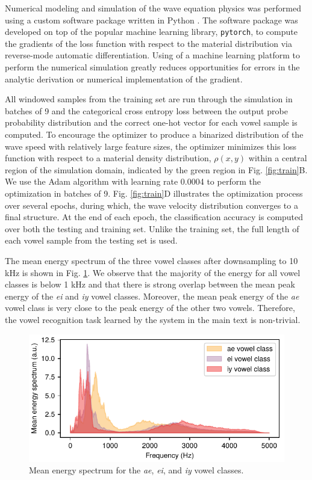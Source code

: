 Numerical modeling and simulation of the wave equation physics was performed using a custom software package written in Python \cite{wavetorch}.
The software package was developed on top of the popular machine learning library, \texttt{pytorch}, to compute the gradients of the loss function with respect to the material distribution via reverse-mode automatic differentiation.
Using of a machine learning platform to perform the numerical simulation greatly reduces opportunities for errors in the analytic derivation or numerical implementation of the gradient. 

All windowed samples from the training set are run through the simulation in batches of 9 and the categorical cross entropy loss between the output probe probability distribution and the correct one-hot vector for each vowel sample is computed.
To encourage the optimizer to produce a binarized distribution of the wave speed with relatively large feature sizes, the optimizer minimizes this loss function with respect to a material density distribution, $\rho{\left(x,y\right)}$ within a central region of the simulation domain, indicated by the green region in Fig. \ref{fig:train}B. 
We use the Adam algorithm \cite{kingma_adam_2014} with learning rate 0.0004 to perform the optimization in batches of 9.
Fig. \ref{fig:train}D illustrates the optimization process over several epochs, during which, the wave velocity distribution converges to a final structure.
At the end of each epoch, the classification accuracy is computed over both the testing and training set. 
Unlike the training set, the full length of each vowel sample from the testing set is used.

The mean energy spectrum of the three vowel classes after downsampling to 10 kHz is shown in Fig. \ref{fig:s_spectrum}.
We observe that the majority of the energy for all vowel classes is below 1 kHz and that there is strong overlap between the mean peak energy of the \textit{ei} and \textit{iy} vowel classes.
Moreover, the mean peak energy of the \textit{ae} vowel class is very close to the peak energy of the other two vowels.
Therefore, the vowel recognition task learned by the system in the main text is non-trivial.

\begin{figure}[t]
  \centering
  \includegraphics{figures/insitu_spectrum}
  \caption{Mean energy spectrum for the \textit{ae}, \textit{ei}, and \textit{iy} vowel classes.}
  \label{fig:s_spectrum}
\end{figure}

